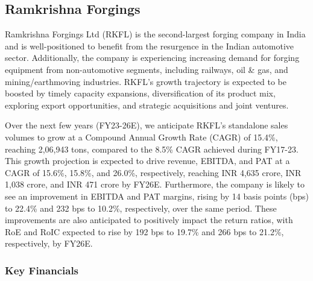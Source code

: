 \subsection{Ramkrishna Forgings}

Ramkrishna Forgings Ltd (RKFL) is the second-largest forging company in India and is well-positioned to benefit from the resurgence in the Indian automotive sector. Additionally, the company is experiencing increasing demand for forging equipment from non-automotive segments, including railways, oil \& gas, and mining/earthmoving industries. RKFL's growth trajectory is expected to be boosted by timely capacity expansions, diversification of its product mix, exploring export opportunities, and strategic acquisitions and joint ventures.

Over the next few years (FY23-26E), we anticipate RKFL's standalone sales volumes to grow at a Compound Annual Growth Rate (CAGR) of 15.4\%, reaching 2,06,943 tons, compared to the 8.5\% CAGR achieved during FY17-23. This growth projection is expected to drive revenue, EBITDA, and PAT at a CAGR of 15.6\%, 15.8\%, and 26.0\%, respectively, reaching INR 4,635 crore, INR 1,038 crore, and INR 471 crore by FY26E. Furthermore, the company is likely to see an improvement in EBITDA and PAT margins, rising by 14 basis points (bps) to 22.4\% and 232 bps to 10.2\%, respectively, over the same period. These improvements are also anticipated to positively impact the return ratios, with RoE and RoIC expected to rise by 192 bps to 19.7\% and 266 bps to 21.2\%, respectively, by FY26E.

\subsubsection{Key Financials}


